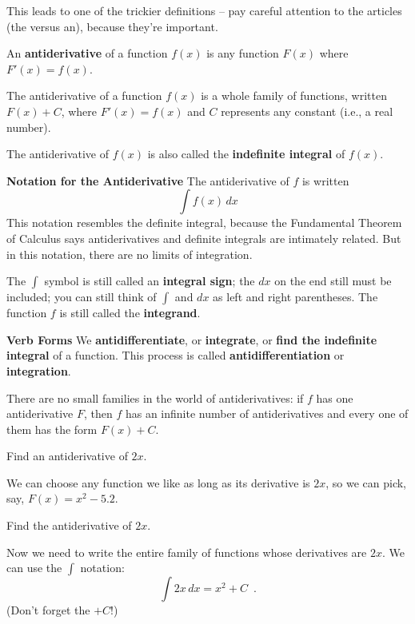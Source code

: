 This leads to one of the trickier definitions – pay careful attention to the articles (the versus an), because they're important.

\begin{definition}[Antiderivatives]
An {\bf antiderivative} of a function $f(x)$ is any function $F(x)$ where $F'(x)=f(x)$.

The antiderivative of a function $f(x)$ is a whole family of functions, written $F(x)+C$, where $F'(x)=f(x)$ and $C$ represents any constant (i.e., a real number).

The antiderivative of $f(x)$ is also called the {\bf indefinite integral} of $f(x)$.

{\bf Notation for the Antiderivative}
The antiderivative of $f$ is written
$$\int f(x)\,dx$$
This notation resembles the definite integral, because the Fundamental Theorem of Calculus says antiderivatives and definite integrals are intimately related. But in this notation, there are no limits of integration.

The $\int$ symbol is still called an {\bf integral sign}; the $dx$  on the end still must be included; you can still think of $\int$ and $dx$  as left and right parentheses. The function $f$ is still called the {\bf integrand}.

{\bf Verb Forms}
We {\bf antidifferentiate}, or {\bf integrate}, or {\bf find the indefinite integral} of a function. This process is called {\bf antidifferentiation} or {\bf integration}.
\end{definition}

There are no small families in the world of antiderivatives: if $f$ has one antiderivative $F$, then $f$ has an infinite number of antiderivatives and every one of them has the form $F(x)+C$.

\begin{example}
Find an antiderivative of $2x$.
\begin{solution}
We can choose any function we like as long as its derivative is $2x$, so we can pick, say, $F(x)=x^2-5.2$.
\end{solution}\end{example}

\begin{example}
Find the antiderivative of $2x$.

\begin{solution}
  Now we need to write the entire family of functions whose derivatives are $2x$. We can use the $\int$ notation:
$$\int 2x\,dx = x^2+C \enspace .$$
(Don't forget the $+C$!)
\end{solution}\end{example}

